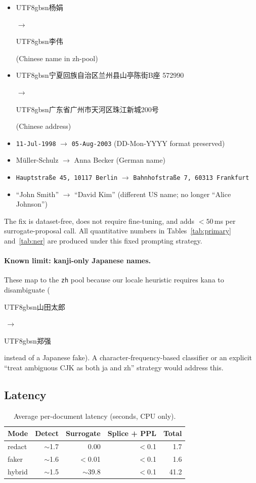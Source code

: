 \documentclass[11pt]{article}
\newcommand{\code}[1]{\texttt{#1}}
\newcommand{\arrowto}{\ensuremath{\rightarrow}}
\newcommand{\cjk}[1]{\begin{CJK*}{UTF8}{gbsn}#1\end{CJK*}}
\begin{document}
\begin{itemize}[leftmargin=*, itemsep=1pt, topsep=2pt]
  \item \cjk{杨娟} \arrowto{} \cjk{李伟} (Chinese name in zh-pool)
  \item \cjk{宁夏回族自治区兰州县山亭陈街B座 572990} \arrowto{}
        \cjk{广东省广州市天河区珠江新城200号} (Chinese address)
  \item \code{11-Jul-1998} \arrowto{} \code{05-Aug-2003} (DD-Mon-YYYY
        format preserved)
  \item M\"uller-Schulz \arrowto{} Anna Becker (German name)
  \item \code{Hauptstra\ss e 45, 10117 Berlin} \arrowto{}
        \code{Bahnhofstra\ss e 7, 60313 Frankfurt}
  \item ``John Smith'' \arrowto{} ``David Kim'' (different US name; no
        longer ``Alice Johnson'')
\end{itemize}

The fix is dataset-free, does not require fine-tuning, and adds
$<50$\,ms per surrogate-proposal call. All quantitative numbers in
Tables~\ref{tab:primary} and~\ref{tab:ner} are produced under this
fixed prompting strategy.

\paragraph{Known limit: kanji-only Japanese names.}
These map to the \code{zh} pool because our locale heuristic requires
kana to disambiguate (\cjk{山田太郎}\,\arrowto\,\cjk{郑强} instead of a
Japanese fake). A character-frequency-based classifier or an explicit
``treat ambiguous CJK as both ja and zh'' strategy would address this.

\subsection{Latency}
\label{sec:latency}

\begin{table}[t]
\centering
\caption{Average per-document latency (seconds, CPU only).}
\label{tab:latency}
\begin{tabular}{l r r r r}
\toprule
\textbf{Mode} & \textbf{Detect} & \textbf{Surrogate}
& \textbf{Splice + PPL} & \textbf{Total} \\
\midrule
redact  & $\sim$1.7 & 0.00       & $<$0.1 & 1.7  \\
faker   & $\sim$1.6 & $<$0.01    & $<$0.1 & 1.6  \\
hybrid  & $\sim$1.5 & $\sim$39.8 & $<$0.1 & 41.2 \\
\bottomrule
\end{tabular}
\end{table}
\end{document}
